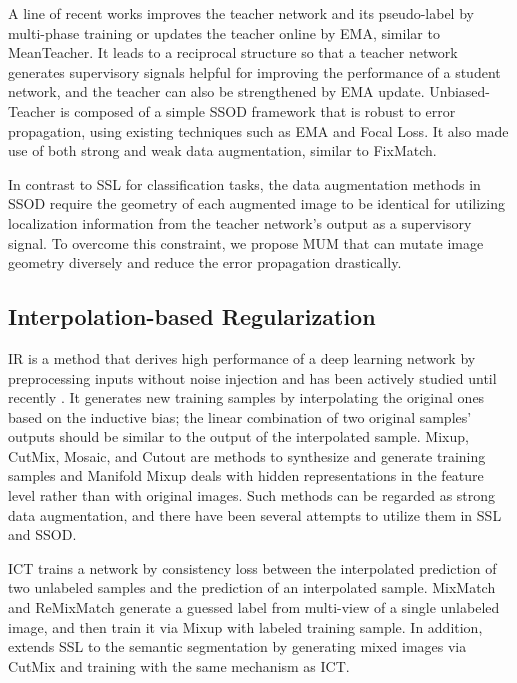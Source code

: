 \documentclass[10pt,twocolumn,letterpaper]{article}
\begin{document}
A line of recent works improves the teacher network and its pseudo-label by multi-phase training\cite{wang2021data} or updates the teacher online by EMA\cite{liu2021unbiased, yang2021interactive, zhou2021instant}, similar to MeanTeacher\cite{tarvainen2017mean}.
It leads to a reciprocal structure so that a teacher network generates supervisory signals helpful for improving the performance of a student network, and the teacher can also be strengthened by EMA update.
Unbiased-Teacher\cite{liu2021unbiased} is composed of a simple SSOD framework that is robust to error propagation, using existing techniques such as EMA and Focal Loss\cite{lin2017focal}. 
It also made use of both strong and weak data augmentation, similar to FixMatch\cite{sohn2020fixmatch}.

In contrast to SSL for classification tasks, the data augmentation methods in SSOD require the geometry of each augmented image to be identical for utilizing localization information from the teacher network’s output as a supervisory signal.
To overcome this constraint, we propose MUM that can mutate image geometry diversely and reduce the error propagation drastically.

\subsection{Interpolation-based Regularization}
\label{sec:related_ir}
IR is a method that derives high performance of a deep learning network by preprocessing inputs without noise injection and has been actively studied until recently \cite{ge2021yolox, verma2018manifold, zhang2017mixup, tokozume2017betweenclass, cutmix, devries2017cutout,acai, beckham2019adversarial}.
It generates new training samples by interpolating the original ones based on the inductive bias; the linear combination of two original samples’ outputs should be similar to the output of the interpolated sample.
Mixup\cite{zhang2017mixup}, CutMix\cite{cutmix}, Mosaic\cite{ge2021yolox}, and Cutout\cite{devries2017cutout} are methods to synthesize and generate training samples and Manifold Mixup\cite{verma2018manifold} deals with hidden representations in the feature level rather than with original images. 
Such methods can be regarded as strong data augmentation, and there have been several attempts to utilize them in SSL and SSOD. 

ICT\cite{verma2019interpolation} trains a network by consistency loss between the interpolated prediction of two unlabeled samples and the prediction of an interpolated sample.
MixMatch\cite{berthelot2019mixmatch} and ReMixMatch\cite{berthelot2019remixmatch} generate a guessed label from multi-view of a single unlabeled image, and then train it via Mixup\cite{zhang2017mixup} with labeled training sample.
In addition, \cite{french2019semi, kim2020structured} extends SSL to the semantic segmentation by generating mixed images via CutMix\cite{cutmix} and training with the same mechanism as ICT\cite{verma2019interpolation}.
\end{document}
